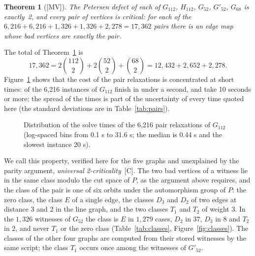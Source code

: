 \documentclass[11pt]{article}
\newtheorem{theorem}{Theorem}[section]
\theoremstyle{definition}
\theoremstyle{remark}
\newcommand{\PG}{P}
\newcommand{\Gmain}{G_{112}}
\newcommand{\Gsym}{H_{112}}
\newcommand{\Gfty}{G_{52}}
\newcommand{\Gftyb}{G'_{52}}
\newcommand{\Gsix}{G_{68}}
\newcommand{\mv}{\textup{[MV]}}
\newcommand{\cj}{\textup{[C]}}
\begin{document}
\begin{theorem}[\mv]\label{thm:defect}
The Petersen defect of each of $\Gmain$, $\Gsym$, $\Gfty$, $\Gftyb$, $\Gsix$ is exactly~2, and
every pair of vertices is critical: for each of the $6{,}216 + 6{,}216 + 1{,}326 + 1{,}326 + 2{,}278 =
17{,}362$ pairs there is an edge map whose bad vertices are exactly the pair.
\end{theorem}

The total of Theorem~\ref{thm:defect} is
\begin{equation}\label{eq:pairs}
17{,}362 = 2\binom{112}{2} + 2\binom{52}{2} + \binom{68}{2} = 12{,}432 + 2{,}652 + 2{,}278 .
\end{equation}
Figure~\ref{fig:pairtimes} shows that the cost of the pair relaxations is concentrated at short times:
\PairUnderOne{} of the 6{,}216 instances of $\Gmain$ finish in under a second, and \PairOverTen{} take
10 seconds or more; the spread of the times is part of the uncertainty of every time quoted here (the
standard deviations are in Table~\ref{tab:pairs}).

\begin{figure}[htbp]\centering

\caption{Distribution of the solve times of the 6{,}216 pair relaxations of $\Gmain$ (log-spaced
bins from 0.1 s to 31.6 s; the median is 0.44 s and the slowest instance 20 s).}\label{fig:pairtimes}
\end{figure}

We call this property, verified here for the five graphs and unexplained by the parity argument,
\emph{universal 2-criticality}~\cj{}. The two bad vertices of a witness lie in the same class modulo
the cut space of $\PG$, as the argument above requires, and the class of the pair is one of six
orbits under the automorphism group of $\PG$: the zero class, the class $E$ of a single edge, the
classes $D_3$ and $D_2$ of two edges at distance 3 and 2 in the line graph, and the two classes $T_1$
and $T_2$ of weight 3. In the $1{,}326$ witnesses of $\Gfty$ the class is $E$ in $1{,}279$ cases,
$D_2$ in 37, $D_3$ in 8 and $T_2$ in 2, and never $T_1$ or the zero class
(Table~\ref{tab:classes}, Figure~\ref{fig:classes}). The classes of the other four graphs are
computed from their stored witnesses by the same script; the class $T_1$ occurs once among the
witnesses of $\Gftyb$.

\begin{table}[htbp]\centering\footnotesize\setlength{\tabcolsep}{4pt}

\caption{Cut-space class of the two bad vertices in the pair witnesses of the five graphs, computed
from the archived witnesses with the invariant of the class (inner products with a basis of the
cycle space of $\PG$).}\label{tab:classes}
\end{table}
\end{document}

